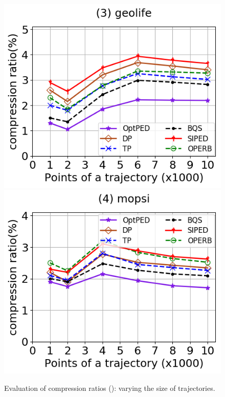 \begin{figure}[tb!]
	\includegraphics[scale=0.315]{Figures/Exp-PED-CR-size-geolife.png}	\hspace{1ex}
	\includegraphics[scale=0.315]{Figures/Exp-PED-CR-size-mopsi.png}		
	\vspace{-2.5ex}
	\caption{\small Evaluation of compression ratios (\ped): varying the size of
    trajectories.}
  \label{fig:cr-ped-size}
	\vspace{-2ex}
\end{figure}

